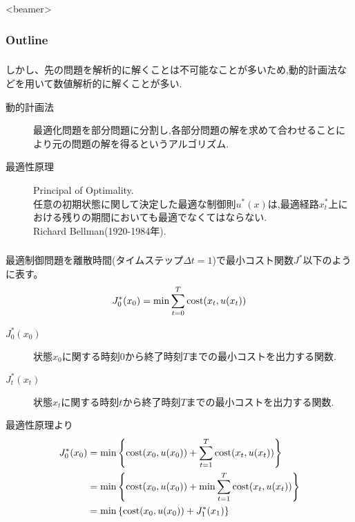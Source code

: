 \documentclass[dvipdfmx,12px]{beamer}
\begin{document}
  		\AtBeginSubsection[]{}
  		\begin{frame}<beamer>
  			\frametitle{Outline}
  		\end{frame}
			\begin{frame}
				\frametitle{\sectionTitleName{}}
				しかし、先の問題を解析的に解くことは不可能なことが多いため,動的計画法などを用いて数値解析的に解くことが多い.
				\begin{description}
					\item[動的計画法]
						最適化問題を部分問題に分割し,各部分問題の解を求めて合わせることにより元の問題の解を得るというアルゴリズム.
					\item[最適性原理]
						Principal of Optimality.\\
						任意の初期状態に関して決定した最適な制御則$u^{*}(x)$は,最適経路$x^{*}_t$上における残りの期間においても最適でなくてはならない.\\
						Richard Bellman(1920-1984年).
				\end{description}
			\end{frame}
			\begin{frame}
				\frametitle{\sectionTitleName{}}
				最適制御問題を離散時間(タイムステップ$\Delta t = 1$)で最小コスト関数$J^{*}$以下のように表す。
				\begin{align*}
					J^{*}_0 (x_0) = {\rm min} \sum_{t=0}^{T} {\rm cost}(x_t, u(x_t))
				\end{align*}
				\begin{description}
					\item[$J^{*}_0 (x_0)$] 状態$x_0$に関する時刻$0$から終了時刻$T$までの最小コストを出力する関数.
					\item[$J^{*}_t (x_t)$] 状態$x_t$に関する時刻$t$から終了時刻$T$までの最小コストを出力する関数.
				\end{description}
				最適性原理より
				\begin{align*}
					J^{*}_0 (x_0)
							&= {\rm min} \left\{ {\rm cost}(x_0, u(x_0)) 
									+ \sum_{t=1}^{T} {\rm cost}(x_t, u(x_t)) \right\} \\
							&= {\rm min} \left\{ {\rm cost}(x_0, u(x_0)) 
									+ {\rm min} \sum_{t=1}^{T} {\rm cost}(x_t, u(x_t)) \right\} \\
							&= {\rm min} \left\{ {\rm cost}(x_0, u(x_0)) + J^{*}_1 (x_1) \right\}
				\end{align*}
			\end{frame}
\end{document}
